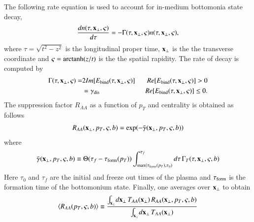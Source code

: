 {{The following rate equation is used to account for in-medium bottomonia state decay,
%
\begin{equation} \label{eq:rate}
\frac{dn(\tau,{\bf x}_\perp,\varsigma)}{d\tau} = -\Gamma(\tau,{\bf x}_\perp,\varsigma)n(\tau,{\bf x}_\perp,\varsigma) ,
\end{equation}
%
where   $\tau = \sqrt{t^{2} - z^{2}}$ is the longitudinal proper time,  ${\bf x}_{\perp}$ is the the transverse coordinate and 
 $\varsigma = {\rm arctanh}(z/t)$ is the the spatial rapidity. The rate of decay is computed by~\cite{Strickland:2011aa}
%
\begin{eqnarray}
\Gamma(\tau, {\bf x}_{\perp}, \varsigma) = 
& 2Im[E_{\text{bind}}(\tau, {\bf x}_{\perp}, \varsigma)] & \ \ Re[E_{\text{bind}}(\tau, {\bf x}_{\perp}, \varsigma)] > 0 \\ 
& = \gamma_{\text{dis}} & \ \ Re[E_{\text{bind}}(\tau, {\bf x}_{\perp}, \varsigma)] \leq 0. 
\end{eqnarray}
%
The suppression factor $R_{AA}$ as a function of $p_T$ and centrality 
is obtained as follows
\begin{equation}
R_{AA}({\bf x}_\perp,p_T,\varsigma,b) =%
\exp\!\left(-\bar{\gamma}({\bf x}_\perp,p_T,\varsigma,b) \right)
\end{equation}
where
\begin{equation}
 \bar{\gamma}({\bf x}_\perp,p_T,
\varsigma,b) \equiv \Theta(\tau_f-\tau_{\rm form}(p_T)) \int_{{\rm max}(\tau_{\rm form}(p_T),\tau_0)}^{\tau_f} 
d\tau\,\Gamma_T(\tau,{\bf x}_\perp,\varsigma,b) 
\end{equation}
  Here $\tau_{0}$ and $\tau_{f}$ are the initial and freeze out times of the plasma and 
$\tau_{\rm form}$ is the formation time of the bottomonium state. 
Finally, one averages
over ${\bf x}_\perp$ to obtain 
\begin{equation}
\langle R_{AA}(p_T,\varsigma,b) \rangle \equiv 
\frac{\int_{{\bf x}_\perp} \! d{\bf x}_\perp \, T_{AA}({\bf x}_\perp)\,%
  R_{AA}({\bf x}_\perp,p_T,\varsigma,b)} 
{\int_{{\bf x}_\perp} \! d{\bf x}_\perp \, T_{AA}({\bf x}_\perp)}
\end{equation} 

}}
